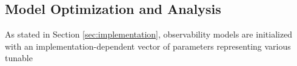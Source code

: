 \subsection{Model Optimization and Analysis}

As stated in Section \ref{sec:implementation}, observability models are initialized with an implementation-dependent vector of parameters representing various tunable 

\subsubsection{}